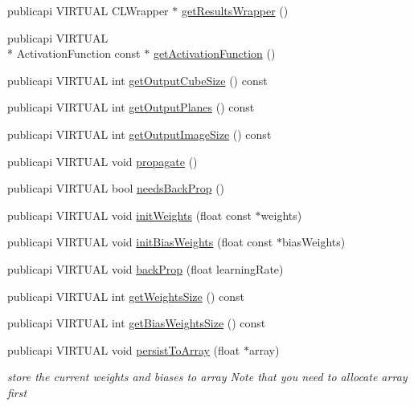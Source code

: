 \begin{DoxyCompactItemize}
\item 
publicapi V\-I\-R\-T\-U\-A\-L C\-L\-Wrapper $\ast$ \hyperlink{classLayer_abe0fe88be13188358312b129deb688ac}{get\-Results\-Wrapper} ()
\item 
publicapi V\-I\-R\-T\-U\-A\-L \\*
Activation\-Function const $\ast$ \hyperlink{classLayer_a0ba9ca126aa2618018823555fb3c9737}{get\-Activation\-Function} ()
\item 
publicapi V\-I\-R\-T\-U\-A\-L int \hyperlink{classLayer_a4d3aab33b1ab977927e7e7358981b572}{get\-Output\-Cube\-Size} () const 
\item 
publicapi V\-I\-R\-T\-U\-A\-L int \hyperlink{classLayer_aca28b88a9ebe40c23fbc72f934980f65}{get\-Output\-Planes} () const 
\item 
publicapi V\-I\-R\-T\-U\-A\-L int \hyperlink{classLayer_ad7ab6a2cb6c247a3f076189b6b66e855}{get\-Output\-Image\-Size} () const 
\item 
publicapi V\-I\-R\-T\-U\-A\-L void \hyperlink{classLayer_a2e03b77adb5127c11f45a3e5927748ad}{propagate} ()
\item 
publicapi V\-I\-R\-T\-U\-A\-L bool \hyperlink{classLayer_a6b870d8f1928d7a054b133a80d5e50d1}{needs\-Back\-Prop} ()
\item 
publicapi V\-I\-R\-T\-U\-A\-L void \hyperlink{classLayer_a582c2a35976d9aaf050a8619c5a630da}{init\-Weights} (float const $\ast$weights)
\item 
publicapi V\-I\-R\-T\-U\-A\-L void \hyperlink{classLayer_acda45ef7133827f399ac682ff409c311}{init\-Bias\-Weights} (float const $\ast$bias\-Weights)
\item 
publicapi V\-I\-R\-T\-U\-A\-L void \hyperlink{classLayer_a74464720a6019ee22eb57c4f876fb812}{back\-Prop} (float learning\-Rate)
\item 
publicapi V\-I\-R\-T\-U\-A\-L int \hyperlink{classLayer_a96234c95cad95b60c44ed0af11b712ba}{get\-Weights\-Size} () const 
\item 
publicapi V\-I\-R\-T\-U\-A\-L int \hyperlink{classLayer_af45c20c2d438d7d17f779e573ba6f784}{get\-Bias\-Weights\-Size} () const 
\item 
publicapi V\-I\-R\-T\-U\-A\-L void \hyperlink{classLayer_a678e0229b3aee66579ba920f11d2c24e}{persist\-To\-Array} (float $\ast$array)
\begin{DoxyCompactList}\small\item\em store the current weights and biases to array Note that you need to allocate array first \end{DoxyCompactList}\item 

\end{DoxyCompactItemize}
